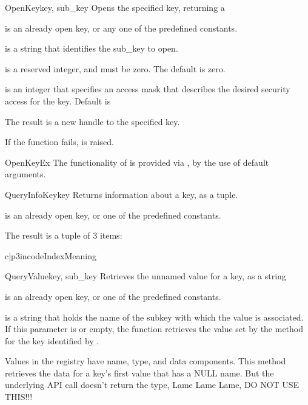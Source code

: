 \begin{funcdesc}{OpenKey}{key, sub_key}
  Opens the specified key, returning a 

  is an already open key, or any one of the predefined
  constants.

  is a string that identifies the sub_key to open.
 
  is a reserved integer, and must be zero.  The default is zero.
 
  is an integer that specifies an access mask that describes 
 the desired security access for the key.  Default is 
 
 The result is a new handle to the specified key.
 
 If the function fails,  is raised.
\end{funcdesc}


\begin{funcdesc}{OpenKeyEx}{}
  The functionality of  is provided via
  , by the use of default arguments.
\end{funcdesc}


\begin{funcdesc}{QueryInfoKey}{key}
 Returns information about a key, as a tuple.

  is an already open key, or one of the predefined 
  constants.

 The result is a tuple of 3 items:

 \begin{tableii}{c|p{3in}}{code}{Index}{Meaning}
 \end{tableii}
\end{funcdesc}


\begin{funcdesc}{QueryValue}{key, sub_key}
 Retrieves the unnamed value for a key, as a string

  is an already open key, or one of the predefined 
  constants.

  is a string that holds the name of the subkey with which 
 the value is associated.  If this parameter is  or empty, the 
 function retrieves the value set by the  method 
 for the key identified by .

 Values in the registry have name, type, and data components. This 
 method retrieves the data for a key's first value that has a NULL name.
 But the underlying API call doesn't return the type, Lame Lame Lame,
 DO NOT USE THIS!!!
\end{funcdesc}


